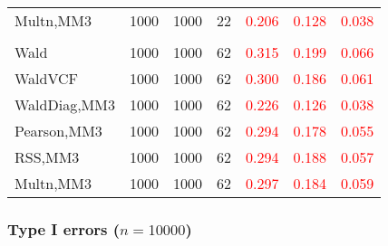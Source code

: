 \documentclass[
]{article}
\begin{document}
\begin{table}[H]
{\begin{tabular}[t]{lrrrrrr}
\hspace{1em}Multn,MM3 & 1000 & 1000 & 22 & \textcolor{red}{0.206} & \textcolor{red}{0.128} & \textcolor{red}{0.038}\\
\addlinespace[0.3em]
\multicolumn{7}{l}{\textbf{3F 15V}}\\
\hspace{1em}Wald & 1000 & 1000 & 62 & \textcolor{red}{0.315} & \textcolor{red}{0.199} & \textcolor{red}{0.066}\\
\hspace{1em}WaldVCF & 1000 & 1000 & 62 & \textcolor{red}{0.300} & \textcolor{red}{0.186} & \textcolor{red}{0.061}\\
\hspace{1em}WaldDiag,MM3 & 1000 & 1000 & 62 & \textcolor{red}{0.226} & \textcolor{red}{0.126} & \textcolor{red}{0.038}\\
\hspace{1em}Pearson,MM3 & 1000 & 1000 & 62 & \textcolor{red}{0.294} & \textcolor{red}{0.178} & \textcolor{red}{0.055}\\
\hspace{1em}RSS,MM3 & 1000 & 1000 & 62 & \textcolor{red}{0.294} & \textcolor{red}{0.188} & \textcolor{red}{0.057}\\
\hspace{1em}Multn,MM3 & 1000 & 1000 & 62 & \textcolor{red}{0.297} & \textcolor{red}{0.184} & \textcolor{red}{0.059}\\
\bottomrule
\end{tabular}}
\endgroup{}
\end{table}

\subsubsection{\texorpdfstring{Type I errors
(\(n=10000\))}{Type I errors (n=10000)}}\label{type-i-errors-n10000-1}
\end{document}
